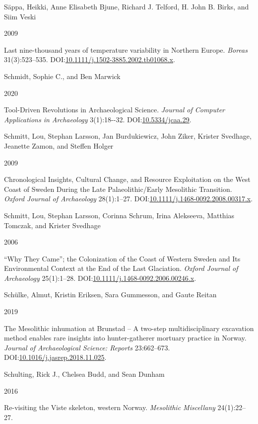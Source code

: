 \documentclass[
  12pt,
  a4paper,
  oneside]{book}
\newlength{\cslhangindent}
\newlength{\csllabelwidth}
\newlength{\cslentryspacingunit} %
\newenvironment{CSLReferences}[2] %
 {%
  \setlength{\parindent}{0pt}
  \ifodd #1
  \let\oldpar\par
  \def\par{\hangindent=\cslhangindent\oldpar}
  \fi
  \setlength{\parskip}{#2\cslentryspacingunit}
 }%
 {}
\newcommand{\CSLBlock}[1]{#1\hfill\break}
\newcommand{\CSLLeftMargin}[1]{\parbox[t]{\csllabelwidth}{#1}}
\newcommand{\CSLRightInline}[1]{\parbox[t]{\linewidth - \csllabelwidth}{#1}\break}
\begin{document}
\begin{CSLReferences}{0}{0}
\leavevmode{}%
\CSLBlock{Säppa, Heikki, Anne Elisabeth Bjune, Richard J. Telford, H. John B. Birks, and Siim Veski}
\CSLLeftMargin{ 2009}
\CSLRightInline{{Last nine-thousand years of temperature variability in Northern Europe}. \emph{Boreas} 31(3):523--535. DOI:\href{https://doi.org/10.1111/j.1502-3885.2002.tb01068.x}{10.1111/j.1502-3885.2002.tb01068.x}.}

\leavevmode{}%
\CSLBlock{Schmidt, Sophie C., and Ben Marwick}
\CSLLeftMargin{ 2020}
\CSLRightInline{{Tool-Driven Revolutions in Archaeological Science}. \emph{Journal of Computer Applications in Archaeology} 3(1):18-\/-32. DOI:\href{https://doi.org/10.5334/jcaa.29}{10.5334/jcaa.29}.}

\leavevmode{}%
\CSLBlock{Schmitt, Lou, Stephan Larsson, Jan Burdukiewicz, John Ziker, Krister Svedhage, Jeanette Zamon, and Steffen Holger}
\CSLLeftMargin{ 2009}
\CSLRightInline{{Chronological Insights, Cultural Change, and Resource Exploitation on the West Coast of Sweden During the Late Palaeolithic/Early Mesolithic Transition}. \emph{Oxford Journal of Archaeology} 28(1):1--27. DOI:\href{https://doi.org/10.1111/j.1468-0092.2008.00317.x}{10.1111/j.1468-0092.2008.00317.x}.}

\leavevmode{}%
\CSLBlock{Schmitt, Lou, Stephan Larsson, Corinna Schrum, Irina Alekseeva, Matthias Tomczak, and Krister Svedhage}
\CSLLeftMargin{ 2006}
\CSLRightInline{{{``Why They Came''}; the Colonization of the Coast of Western Sweden and Its Environmental Context at the End of the Last Glaciation}. \emph{Oxford Journal of Archaeology} 25(1):1--28. DOI:\href{https://doi.org/10.1111/j.1468-0092.2006.00246.x}{10.1111/j.1468-0092.2006.00246.x}.}

\leavevmode{}%
\CSLBlock{Schülke, Almut, Kristin Eriksen, Sara Gummesson, and Gaute Reitan}
\CSLLeftMargin{ 2019}
\CSLRightInline{{The Mesolithic inhumation at Brunstad -- A two-step multidisciplinary excavation method enables rare insights into hunter-gatherer mortuary practice in Norway}. \emph{Journal of Archaeological Science: Reports} 23:662--673. DOI:\href{https://doi.org/10.1016/j.jasrep.2018.11.025}{10.1016/j.jasrep.2018.11.025}.}

\leavevmode{}%
\CSLBlock{Schulting, Rick J., Chelsea Budd, and Sean Dunham}
\CSLLeftMargin{ 2016}
\CSLRightInline{{Re-visiting the Viste skeleton, western Norway}. \emph{Mesolithic Miscellany} 24(1):22--27.}


\end{CSLReferences}
\end{document}
